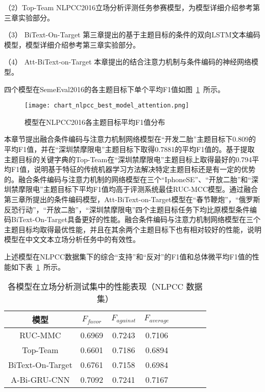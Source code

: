 （2）Top-Team NLPCC2016立场分析评测任务参赛模型，为模型详细介绍参考第三章实验部分。

（3） BiText-On-Target 第三章提出的基于主题目标的条件的双向LSTM文本编码模型，模型详细介绍参考第三章实验部分。

（4） Att-BiText-on-Target 本章提出的结合注意力机制与条件编码的神经网络模型。

四个模型在SemeEval2016的各主题目标下单个平均F1值如图~\ref{chart_nlpcc_best_model_attention}~所示。
\begin{figure}[htbp]
	\centering
	\texttt{[image: chart\_nlpcc\_best\_model\_attention.png]}
	\caption[rnn_vanish]{模型在NLPCC2016各主题目标平均F1值分布}
	\label{chart_nlpcc_best_model_attention}
\end{figure}


本章节提出融合条件编码与注意力机制网络模型在“开发二胎”主题目标下0.809的平均F1值，并在“深圳禁摩限电”主题目标下取得0.7881的平均F1值的。基于提取主题目标的关键字典的Top-Team在“深圳禁摩限电”主题目标上取得最好的0.794平均F1值，说明基于特征的传统机器学习方法解决特定主题目标还是有一定的优势的。融合条件编码与注意力机制的网络模型在三个“IphoneSE”、“开放二胎”和“深圳禁摩限电”主题目标下平均F1值均高于评测系统最佳RUC-MCC模型。通过融合第三章所提出的条件编码模型，Att-BiText-on-Target模型在“春节鞭炮”，“俄罗斯反恐行动”，“开放二胎”，“深圳禁摩限电”四个主题目标任务下均比原模型条件编码BiText-On-Target具备更好的性能。融合条件编码与注意力机制网络模型在三个主题目标均取得最优性能，并且在其余两个主题目标下也有相对较好的性能，说明模型在中文文本立场分析任务中的有效性。

上述模型在NLPCC数据集下的综合“支持”和“反对”的F1值和总体微平均F1值的性能如下表~\ref{nlpcc_res_attention}~所示。
\begin{table}[htbp]
	\caption[table123]{各模型在立场分析测试集中的性能表现（NLPCC 数据集）}
	\label{nlpcc_res_attention}
	\vspace{0.5em}\centering\wuhao
	\begin{tabular}{cccccccc}
		\toprule[1.5pt]
		模型& $F_{favor}$&$F_{against}$&$F_{average}$ \\
		\midrule[1pt]
		RUC-MMC\citeup{xu2016overview}&0.6969&0.7243&0.7106\\
		Top-Team\citeup{xu2016overview}&0.6601&0.7186&0.6894\\
		BiText-On-Target&0.6761&0.7158&0.6984\\
		A-Bi-GRU-CNN&0.7092&0.7241&0.7167\\
		\bottomrule[1.5pt]
	\end{tabular}
\end{table}

